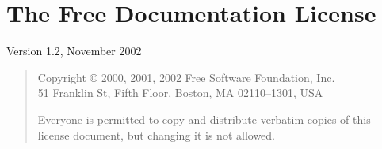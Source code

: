 

\chapter[\acronym{GNU} \acronym{FDL}\commonpart]%
        {The  Free Documentation License\commonpart
          \label{sec:fdl}
          }

Version 1.2, November 2002

\begin{quotation}
  \noindent Copyright \copyright{} 2000, 2001, 2002 Free Software Foundation, Inc. \\
  51 Franklin St, Fifth Floor, Boston, MA  02110--1301, USA

  Everyone is permitted to copy and distribute verbatim copies
  of this license document, but changing it is not allowed.
\end{quotation}

